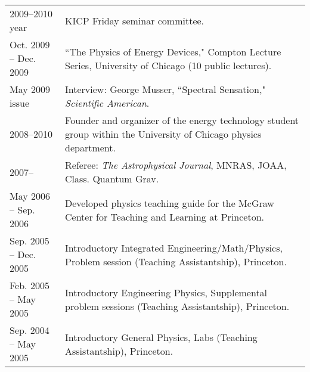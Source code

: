 {\begin{tabular}{l p{12cm}}
2009--2010 year & KICP Friday seminar committee. \\
Oct. 2009 -- Dec. 2009 & ``The Physics of Energy Devices," Compton Lecture Series, University of Chicago (10 public lectures). \\
May 2009 issue & Interview: George Musser, ``Spectral Sensation," {\it Scientific American}. \\
2008--2010     & Founder and organizer of the energy technology student group within the University of Chicago physics department. \\
2007--         & Referee: {\it The Astrophysical Journal}, MNRAS, JOAA, Class. Quantum Grav. \\
May 2006 -- Sep. 2006 & Developed physics teaching guide for the McGraw Center for Teaching and Learning at Princeton. \\
Sep. 2005 -- Dec. 2005 & Introductory Integrated Engineering/Math/Physics, Problem session (Teaching Assistantship), Princeton. \\ %
Feb. 2005 -- May 2005 & Introductory Engineering Physics, Supplemental problem sessions (Teaching Assistantship), Princeton. \\ %
Sep. 2004 -- May 2005 & Introductory General Physics, Labs (Teaching Assistantship), Princeton. \\ %
\end{tabular} \\~\\~\\
}


